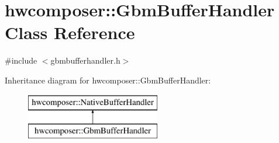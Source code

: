 \hypertarget{classhwcomposer_1_1GbmBufferHandler}{}\section{hwcomposer\+:\+:Gbm\+Buffer\+Handler Class Reference}
\label{classhwcomposer_1_1GbmBufferHandler}


{\ttfamily \#include $<$gbmbufferhandler.\+h$>$}

Inheritance diagram for hwcomposer\+:\+:Gbm\+Buffer\+Handler\+:\begin{figure}[H]
\begin{center}
\leavevmode
\includegraphics[height=2.000000cm]{classhwcomposer_1_1GbmBufferHandler}
\end{center}
\end{figure}
